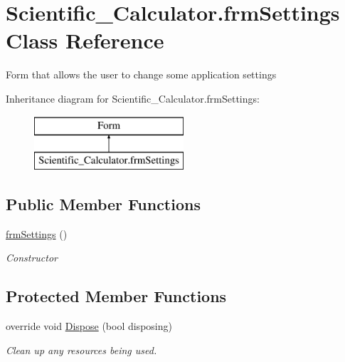 \hypertarget{class_scientific___calculator_1_1frm_settings}{}\section{Scientific\+\_\+\+Calculator.\+frm\+Settings Class Reference}
\label{class_scientific___calculator_1_1frm_settings}


Form that allows the user to change some application settings  


Inheritance diagram for Scientific\+\_\+\+Calculator.\+frm\+Settings\+:\begin{figure}[H]
\begin{center}
\leavevmode
\includegraphics[height=2.000000cm]{class_scientific___calculator_1_1frm_settings}
\end{center}
\end{figure}
\subsection*{Public Member Functions}
\begin{DoxyCompactItemize}
\item 
\hyperlink{class_scientific___calculator_1_1frm_settings_a240b88000ca34b6a5e34b560e5e32f20}{frm\+Settings} ()
\begin{DoxyCompactList}\small\item\em Constructor \end{DoxyCompactList}\end{DoxyCompactItemize}
\subsection*{Protected Member Functions}
\begin{DoxyCompactItemize}
\item 
override void \hyperlink{class_scientific___calculator_1_1frm_settings_a3f5e63317d8fef66f6587a1a19b21b44}{Dispose} (bool disposing)
\begin{DoxyCompactList}\small\item\em Clean up any resources being used. \end{DoxyCompactList}\end{DoxyCompactItemize}


